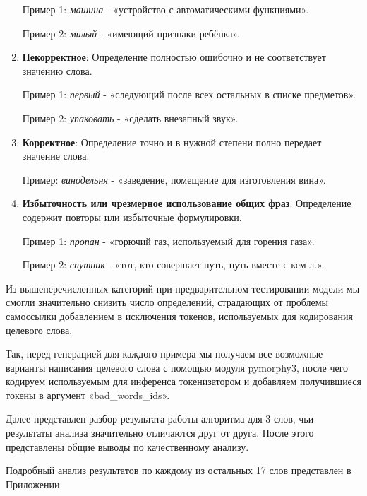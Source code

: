 \documentclass[LI,VKR]{HSEUniversity}
\begin{document}
\begin{enumerate}
Пример 1: \emph{машина} - «устройство с автоматическими функциями».

Пример 2: \emph{милый} - «имеющий признаки ребёнка».

    \item \textbf{Некорректное}:
    Определение полностью ошибочно и не соответствует значению слова.

Пример 1: \emph{первый} - «следующий после всех остальных в списке предметов».

Пример 2: \emph{упаковать} - «сделать внезапный звук».

    \item \textbf{Корректное}:
Определение точно и в нужной степени полно передает значение слова.

Пример: \emph{винодельня} - «заведение, помещение для изготовления вина».

    \item \textbf{Избыточность или чрезмерное использование общих фраз}:
    Определение содержит повторы или избыточные формулировки.

Пример 1: \emph{пропан} - «горючий газ, используемый для горения газа».

Пример 2: \emph{спутник} - «тот, кто совершает путь, путь вместе с кем-л.».
\end{enumerate}

Из вышеперечисленных категорий при предварительном тестировании модели мы смогли значительно
снизить число определений, страдающих от проблемы самоссылки добавлением в исключения токенов,
используемых для кодирования целевого слова.

Так, перед генерацией для каждого примера мы получаем все возможные
варианты написания целевого слова с помощью модуля pymorphy3,
после чего кодируем используемым для инференса токенизатором и добавляем
получившиеся токены в аргумент «bad\_words\_ids».

Далее представлен разбор результата работы алгоритма для 3 слов, чьи результаты анализа
значительно отличаются друг от друга.
После этого представлены общие выводы по качественному анализу.

Подробный анализ результатов по каждому из остальных 17 слов представлен в Приложении.
\end{document}
